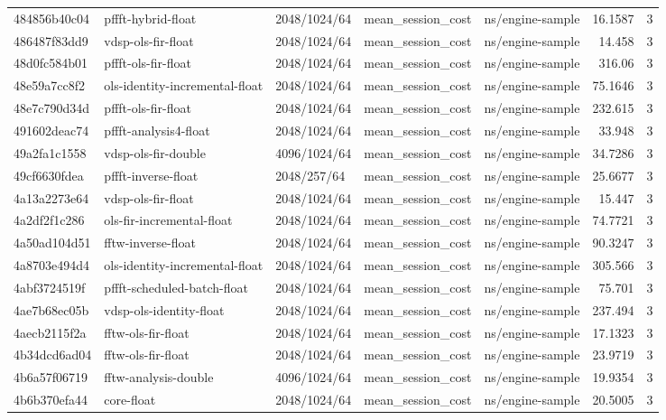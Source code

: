 \begin{longtable}{lllllrr}
484856b40c04 & pffft-hybrid-float & 2048/1024/64 & mean\_session\_cost & ns/engine-sample & 16.1587 & 3 \\
486487f83dd9 & vdsp-ols-fir-float & 2048/1024/64 & mean\_session\_cost & ns/engine-sample & 14.458 & 3 \\
48d0fc584b01 & pffft-ols-fir-float & 2048/1024/64 & mean\_session\_cost & ns/engine-sample & 316.06 & 3 \\
48e59a7cc8f2 & ols-identity-incremental-float & 2048/1024/64 & mean\_session\_cost & ns/engine-sample & 75.1646 & 3 \\
48e7c790d34d & pffft-ols-fir-float & 2048/1024/64 & mean\_session\_cost & ns/engine-sample & 232.615 & 3 \\
491602deac74 & pffft-analysis4-float & 2048/1024/64 & mean\_session\_cost & ns/engine-sample & 33.948 & 3 \\
49a2fa1c1558 & vdsp-ols-fir-double & 4096/1024/64 & mean\_session\_cost & ns/engine-sample & 34.7286 & 3 \\
49cf6630fdea & pffft-inverse-float & 2048/257/64 & mean\_session\_cost & ns/engine-sample & 25.6677 & 3 \\
4a13a2273e64 & vdsp-ols-fir-float & 2048/1024/64 & mean\_session\_cost & ns/engine-sample & 15.447 & 3 \\
4a2df2f1c286 & ols-fir-incremental-float & 2048/1024/64 & mean\_session\_cost & ns/engine-sample & 74.7721 & 3 \\
4a50ad104d51 & fftw-inverse-float & 2048/1024/64 & mean\_session\_cost & ns/engine-sample & 90.3247 & 3 \\
4a8703e494d4 & ols-identity-incremental-float & 2048/1024/64 & mean\_session\_cost & ns/engine-sample & 305.566 & 3 \\
4abf3724519f & pffft-scheduled-batch-float & 2048/1024/64 & mean\_session\_cost & ns/engine-sample & 75.701 & 3 \\
4ae7b68ec05b & vdsp-ols-identity-float & 2048/1024/64 & mean\_session\_cost & ns/engine-sample & 237.494 & 3 \\
4aecb2115f2a & fftw-ols-fir-float & 2048/1024/64 & mean\_session\_cost & ns/engine-sample & 17.1323 & 3 \\
4b34dcd6ad04 & fftw-ols-fir-float & 2048/1024/64 & mean\_session\_cost & ns/engine-sample & 23.9719 & 3 \\
4b6a57f06719 & fftw-analysis-double & 4096/1024/64 & mean\_session\_cost & ns/engine-sample & 19.9354 & 3 \\
4b6b370efa44 & core-float & 2048/1024/64 & mean\_session\_cost & ns/engine-sample & 20.5005 & 3 \\

\end{longtable}
